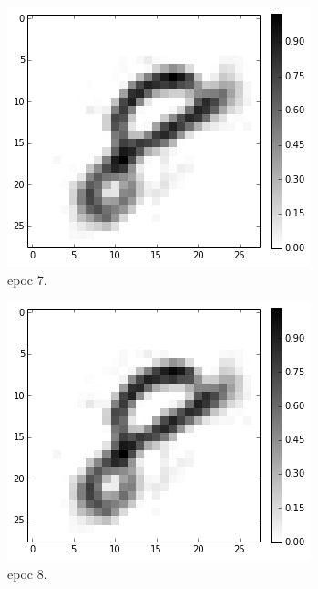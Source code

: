 \begin{figure}[hbt]
\begin{subfigure}[t]{0.18\textwidth}
			\includegraphics[width=\textwidth]{pics_sdbn/b10_epoc7.png}
			\caption{epoc 7.}
		\end{subfigure}
		\begin{subfigure}[t]{0.18\textwidth}
			\includegraphics[width=\textwidth]{pics_sdbn/b10_epoc8.png}
			\caption{epoc 8.}
		\end{subfigure}
		\begin{subfigure}[t]{0.18\textwidth}

\end{subfigure}
\end{figure}
